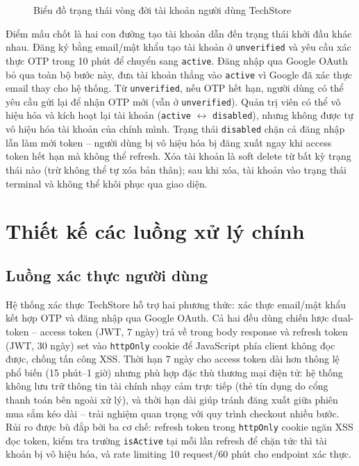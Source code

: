 \clearpage
\begin{figure}[H]
  \centering
  \caption{Biểu đồ trạng thái vòng đời tài khoản người dùng TechStore}
  \label{fig:user_states}
\end{figure}

Điểm mấu chốt là hai con đường tạo tài khoản dẫn đến trạng thái khởi đầu khác nhau. Đăng ký bằng email\slash mật khẩu tạo tài khoản ở \texttt{unverified} và yêu cầu xác thực OTP trong 10 phút để chuyển sang \texttt{active}. Đăng nhập qua Google OAuth bỏ qua toàn bộ bước này, đưa tài khoản thẳng vào \texttt{active} vì Google đã xác thực email thay cho hệ thống. Từ \texttt{unverified}, nếu OTP hết hạn, người dùng có thể yêu cầu gửi lại để nhận OTP mới (vẫn ở \texttt{unverified}). Quản trị viên có thể vô hiệu hóa và kích hoạt lại tài khoản (\texttt{active} $\leftrightarrow$ \texttt{disabled}), nhưng không được tự vô hiệu hóa tài khoản của chính mình. Trạng thái \texttt{disabled} chặn cả đăng nhập lẫn làm mới token -- người dùng bị vô hiệu hóa bị đăng xuất ngay khi access token hết hạn mà không thể refresh. Xóa tài khoản là soft delete từ bất kỳ trạng thái nào (trừ không thể tự xóa bản thân); sau khi xóa, tài khoản vào trạng thái terminal và không thể khôi phục qua giao diện.

\section{Thiết kế các luồng xử lý chính}
\label{sec:c3_sequences}

\subsection{Luồng xác thực người dùng}

Hệ thống xác thực TechStore hỗ trợ hai phương thức: xác thực email\slash mật khẩu kết hợp OTP và đăng nhập qua Google OAuth. Cả hai đều dùng chiến lược dual-token -- access token (JWT, 7 ngày) trả về trong body response và refresh token (JWT, 30 ngày) set vào \texttt{httpOnly} cookie để JavaScript phía client không đọc được, chống tấn công XSS. Thời hạn 7 ngày cho access token dài hơn thông lệ phổ biến (15 phút--1 giờ) nhưng phù hợp đặc thù thương mại điện tử: hệ thống không lưu trữ thông tin tài chính nhạy cảm trực tiếp (thẻ tín dụng do cổng thanh toán bên ngoài xử lý), và thời hạn dài giúp tránh đăng xuất giữa phiên mua sắm kéo dài -- trải nghiệm quan trọng với quy trình checkout nhiều bước. Rủi ro được bù đắp bởi ba cơ chế: refresh token trong \texttt{httpOnly} cookie ngăn XSS đọc token, kiểm tra trường \texttt{isActive} tại mỗi lần refresh để chặn tức thì tài khoản bị vô hiệu hóa, và rate limiting 10 request\slash 60 phút cho endpoint xác thực.

